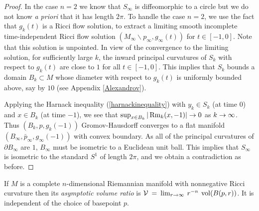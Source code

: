 \begin{proof}
In the case $n=2$ we know that $S_\infty$ is diffeomorphic to a circle but
we do not know {\it a priori} that it has length $2\pi$.
To handle the case $n = 2$, we use the fact that $g_k(t)$ is
a Ricci flow solution, to
extract a limiting smooth incomplete
time-independent Ricci flow solution
$(M_\infty \backslash p_\infty, g_\infty(t))$ for $t \in [-1, 0]$.
Note that this solution is unpointed.
In view of the
convergence to the limiting solution,
for sufficiently large $k$,
the inward principal curvatures of $S_k$ with respect to $g_k(t)$
are close to $1$ for all $t\in [-1,0]$.
This implies that
$S_k$ bounds a domain $B_k\subset M$ whose diameter with
respect to $g_k(t)$ is uniformly bounded above, say by $10$
(see Appendix \ref{Alexandrov}).

Applying the Harnack
inequality (\ref{harnackinequality})
with $y_k\in S_k$ (at time $0$) and $x\in B_k$
(at time $-1$), we see that
$\sup_{x\in B_k}|\operatorname{Rm}_k(x,-1)|\rightarrow 0$ as $k\rightarrow \infty$.
Thus $(B_k,p,g_k(-1))$ Gromov-Hausdorff converges to a flat manifold
$(B_\infty,\bar p_\infty,g_\infty(-1))$
with convex boundary. As all of the principal curvatures of
$\partial B_\infty$ are $1$,
$B_\infty$ must be isometric to a Euclidean unit ball.
This implies that $S_\infty$ is isometric to the standard $S^1$ of
length $2\pi$,
and we obtain a contradiction as before.
\end{proof}

\begin{definition}
  \label{def:kl-asymptotic-scalar-curvature-asymptotic-volume-ratio-asymptotic-volume-ratio-definition}

If $M$ is a complete $n$-dimensional
Riemannian manifold with nonnegative Ricci curvature
then its {\em asymptotic
volume ratio} is ${\mathcal V} \: = \:
\lim_{r \rightarrow \infty} \: r^{-n} \: \operatorname{vol}(B(p, r))$. It is independent
of the choice of basepoint $p$.
\end{definition}

